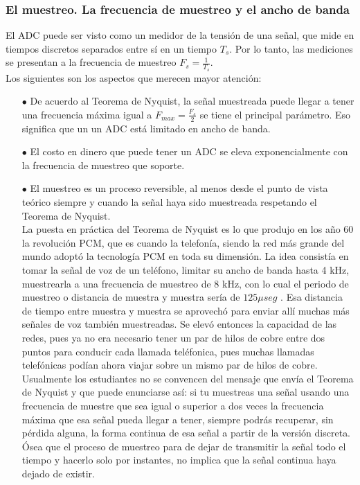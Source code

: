\subsubsection{El muestreo. La frecuencia de muestreo y el ancho de banda}

El ADC puede ser visto como un medidor de la tensión de una señal, que mide en tiempos discretos separados entre sí en un tiempo $T_s$. Por lo tanto, las mediciones se presentan a la frecuencia de muestreo $F_s=\frac{1}{T_s}$.\\

Los siguientes son los aspectos que merecen mayor atención: \\
\begin{itemize}
	\item [$\bullet$] De acuerdo al Teorema de Nyquist, la señal muestreada puede llegar a tener una frecuencia máxima igual a $F_{max}=\frac{F_s}{2}$ se tiene el principal parámetro. Eso significa que un un ADC está limitado en ancho de banda.
    \item [$\bullet$] El costo en dinero que puede tener un ADC se eleva exponencialmente con la frecuencia de muestreo que soporte.
    \item [$\bullet$]  El muestreo es un proceso reversible, al menos desde el punto de vista teórico siempre y cuando la señal haya sido muestreada respetando el Teorema de Nyquist. \\
    
La puesta en práctica del Teorema de Nyquist es lo que produjo en los año 60 la revolución PCM, que es cuando la telefonía, siendo la red más grande del mundo adoptó la tecnología PCM en toda su dimensión. La idea consistía en tomar la señal de voz de un teléfono, limitar su ancho de banda hasta 4 kHz, muestrearla a una frecuencia de muestreo de 8 kHz, con lo cual el periodo de muestreo o distancia de muestra y muestra sería de $125 \mu seg$ . Esa distancia de tiempo entre muestra y muestra se aprovechó para enviar allí muchas más señales de voz también muestreadas. Se elevó entonces la capacidad de las redes, pues ya no era necesario tener un par de hilos de cobre entre dos puntos para conducir cada llamada teléfonica, pues muchas llamadas telefónicas podían ahora viajar sobre un mismo par de hilos de cobre.\\

Usualmente los estudiantes no se convencen del mensaje que envía el Teorema de Nyquist y que puede enunciarse así: si tu muestreas una señal usando una frecuencia de muestre que sea igual o superior a dos veces la frecuencia máxima que esa señal pueda llegar a tener, siempre podrás recuperar, sin pérdida alguna, la forma continua de esa señal a partir de la versión discreta. Ósea que el proceso de muestreo para de dejar de transmitir la señal todo el tiempo y hacerlo solo por instantes, no implica que la señal continua haya dejado de existir. \\

    
\end{itemize}
